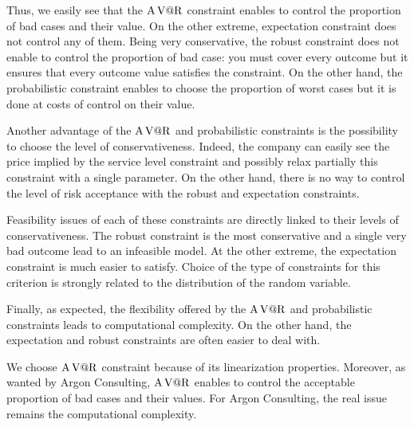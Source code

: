 Thus, we easily see that the $\operatorname{A\operatorname{V@R}}$ constraint enables to control the proportion of bad cases and their value.
On the other extreme, expectation constraint does not control any of them.
Being very conservative, the robust constraint does not enable to control the proportion of bad case: you must cover every outcome but it ensures that every outcome value satisfies the constraint.
On the other hand, the probabilistic constraint enables to choose the proportion of worst cases but it is done at costs of control on their value.


Another advantage of the $\operatorname{A\operatorname{V@R}}$ and probabilistic constraints is the possibility to choose the level of conservativeness.
Indeed, the company can easily see the price implied by the service level constraint and possibly relax partially this constraint with a single parameter.
On the other hand, there is no way to control the level of risk acceptance with the robust and expectation constraints.


Feasibility issues of each of these constraints are directly linked to their levels of conservativeness.
The robust constraint is the most conservative and a single very bad outcome lead to an infeasible model.
At the other extreme, the expectation constraint is much easier to satisfy.
Choice of the type of constraints for this criterion is strongly related to the distribution of the random variable.


Finally, as expected, the flexibility offered by the $\operatorname{A\operatorname{V@R}}$ and probabilistic constraints leads to computational complexity.
On the other hand, the expectation and robust constraints are often easier to deal with.


\medskip


We choose $\operatorname{A\operatorname{V@R}}$ constraint because of its linearization properties.
Moreover, as wanted by Argon Consulting, $\operatorname{A\operatorname{V@R}}$ enables to control the acceptable proportion of bad cases and their values.
For Argon Consulting, the real issue remains the computational complexity.


